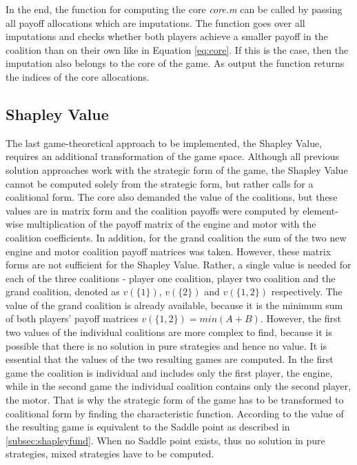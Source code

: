 In the end, the function for computing the core \textit{core.m} can be called by passing all payoff allocations which are imputations. The function goes over all imputations and checks whether both players achieve a smaller payoff in the coalition than on their own like in Equation \ref{eq:core}. If this is the case, then the imputation also belongs to the core of the game. As output the function returns the indices of the core allocations.

\subsection{Shapley Value}
\label{subsec:shapleyimpl}
The last game-theoretical approach to be implemented, the Shapley Value, requires an additional transformation of the game space. Although all previous solution approaches work with the strategic form of the game, the Shapley Value cannot be computed solely from the strategic form, but rather calls for a coalitional form. The core also demanded the value of the coalitions, but these values are in matrix form and the coalition payoffs were computed by element-wise multiplication of the payoff matrix of the engine and motor with the coalition coefficients. In addition, for the grand coalition the sum of the two new engine and motor coalition payoff matrices was taken. However, these matrix forms are not sufficient for the Shapley Value. Rather, a single value is needed for each of the three coalitions - player one coalition, player two coalition and the grand coalition, denoted as $v(\{1\})$, $v(\{2\})$ and $v(\{1,2\})$ respectively. The value of the grand coalition is already available, because it is the minimum sum of both players' payoff matrices $v(\{1,2\}) = min(A+B)$. However, the first two values of the individual coalitions are more complex to find, because it is possible that there is no solution in pure strategies and hence no value. It is essential that the values of the two resulting games are computed. In the first game the coalition is individual and includes only the first player, the engine, while in the second game the individual coalition contains only the second player, the motor. That is why the strategic form of the game has to be transformed to coalitional form by finding the characteristic function. According to \citet{ferguson2014game} the value of the resulting game is equivalent to the Saddle point as described in \ref{subsec:shapleyfund}. When no Saddle point exists, thus no solution in pure strategies, mixed strategies have to be computed.

